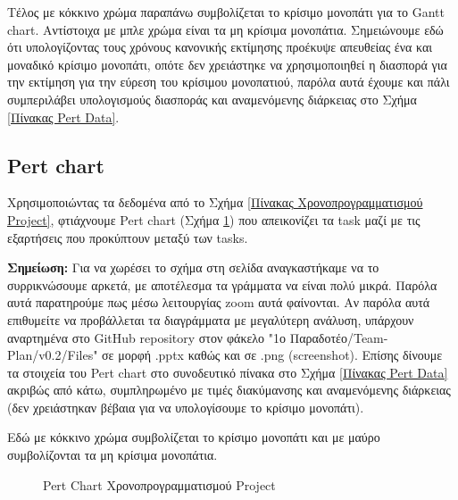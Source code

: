 \documentclass[12pt,a4paper]{article}
\begin{document}
Τέλος με κόκκινο χρώμα παραπάνω συμβολίζεται το κρίσιμο μονοπάτι για το Gantt chart. Αντίστοιχα με μπλε χρώμα είναι τα μη κρίσιμα μονοπάτια. Σημειώνουμε εδώ ότι υπολογίζοντας τους χρόνους κανονικής εκτίμησης προέκυψε απευθείας ένα και μοναδικό κρίσιμο μονοπάτι, οπότε δεν χρειάστηκε να χρησιμοποιηθεί η διασπορά για την εκτίμηση για την εύρεση του κρίσιμου μονοπατιού, παρόλα αυτά έχουμε και πάλι συμπεριλάβει υπολογισμούς διασποράς και αναμενόμενης διάρκειας στο Σχήμα \ref{Πίνακας Pert Data}.


\subsection{Pert chart}
\label{Ενότητα Pert Chart}
Χρησιμοποιώντας τα δεδομένα από το Σχήμα \ref{Πίνακας Χρονοπρογραμματισμού Project}, φτιάχνουμε Pert chart (Σχήμα \ref{Pert Chart Χρονοπρογραμματισμού Project}) που απεικονίζει τα task μαζί με τις εξαρτήσεις που προκύπτουν μεταξύ των tasks.

\textbf{Σημείωση:} Για να χωρέσει το σχήμα στη σελίδα αναγκαστήκαμε να το συρρικνώσουμε αρκετά, με αποτέλεσμα τα γράμματα να είναι πολύ μικρά. Παρόλα αυτά παρατηρούμε πως μέσω λειτουργίας zoom αυτά φαίνονται. Αν παρόλα αυτά επιθυμείτε να προβάλλεται τα διαγράμματα με μεγαλύτερη ανάλυση, υπάρχουν αναρτημένα στο GitHub repository στον φάκελο "1ο Παραδοτέο/Team-Plan/v0.2/Files" σε μορφή .pptx καθώς και σε .png (screenshot). Επίσης δίνουμε τα στοιχεία του Pert chart στο συνοδευτικό πίνακα στο Σχήμα \ref{Πίνακας Pert Data} ακριβώς από κάτω, συμπληρωμένο με τιμές διακύμανσης και αναμενόμενης διάρκειας (δεν χρειάστηκαν βέβαια για να υπολογίσουμε το κρίσιμο μονοπάτι).

Εδώ με κόκκινο χρώμα συμβολίζεται το κρίσιμο μονοπάτι και με μαύρο συμβολίζονται τα μη κρίσιμα μονοπάτια.

\begin{figure}[H]
	\caption{Pert Chart Χρονοπρογραμματισμού Project}
	\label{Pert Chart Χρονοπρογραμματισμού Project}
\end{figure}
\end{document}
